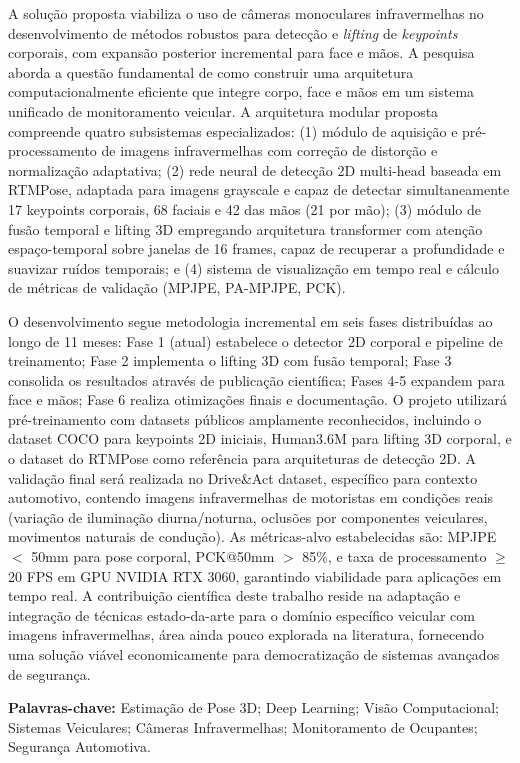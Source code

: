 \documentclass[12pt, a4paper]{article}
\begin{document}
A solução proposta viabiliza o uso de câmeras monoculares infravermelhas no desenvolvimento de métodos robustos para detecção e \textit{lifting} de \textit{keypoints} corporais, com expansão posterior incremental para face e mãos. A pesquisa aborda a questão fundamental de como construir uma arquitetura computacionalmente eficiente que integre corpo, face e mãos em um sistema unificado de monitoramento veicular. A arquitetura modular proposta compreende quatro subsistemas especializados: (1) módulo de aquisição e pré-processamento de imagens infravermelhas com correção de distorção e normalização adaptativa; (2) rede neural de detecção 2D multi-head baseada em RTMPose, adaptada para imagens grayscale e capaz de detectar simultaneamente 17 keypoints corporais, 68 faciais e 42 das mãos (21 por mão); (3) módulo de fusão temporal e lifting 3D empregando arquitetura transformer com atenção espaço-temporal sobre janelas de 16 frames, capaz de recuperar a profundidade e suavizar ruídos temporais; e (4) sistema de visualização em tempo real e cálculo de métricas de validação (MPJPE, PA-MPJPE, PCK).

O desenvolvimento segue metodologia incremental em seis fases distribuídas ao longo de 11 meses: Fase 1 (atual) estabelece o detector 2D corporal e pipeline de treinamento; Fase 2 implementa o lifting 3D com fusão temporal; Fase 3 consolida os resultados através de publicação científica; Fases 4-5 expandem para face e mãos; Fase 6 realiza otimizações finais e documentação. O projeto utilizará pré-treinamento com datasets públicos amplamente reconhecidos, incluindo o dataset COCO para keypoints 2D iniciais, Human3.6M para lifting 3D corporal, e o dataset do RTMPose como referência para arquiteturas de detecção 2D. A validação final será realizada no Drive\&Act dataset, específico para contexto automotivo, contendo imagens infravermelhas de motoristas em condições reais (variação de iluminação diurna/noturna, oclusões por componentes veiculares, movimentos naturais de condução). As métricas-alvo estabelecidas são: MPJPE $<$ 50mm para pose corporal, PCK@50mm $>$ 85\%, e taxa de processamento $\geq$ 20 FPS em GPU NVIDIA RTX 3060, garantindo viabilidade para aplicações em tempo real. A contribuição científica deste trabalho reside na adaptação e integração de técnicas estado-da-arte para o domínio específico veicular com imagens infravermelhas, área ainda pouco explorada na literatura, fornecendo uma solução viável economicamente para democratização de sistemas avançados de segurança.

\vspace{0.5cm}
\noindent\textbf{Palavras-chave:} Estimação de Pose 3D; Deep Learning; Visão Computacional; Sistemas Veiculares; Câmeras Infravermelhas; Monitoramento de Ocupantes; Segurança Automotiva.
\end{document}
